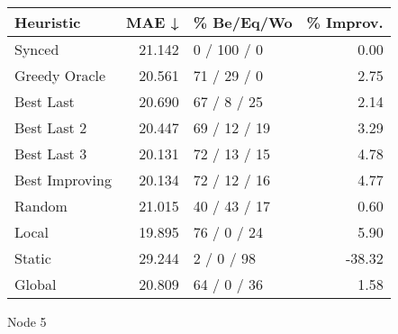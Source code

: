 \begin{tabular}{lrlr}
\toprule
\textbf{Heuristic} & \textbf{MAE ↓} & \textbf{\% Be/Eq/Wo} & \textbf{\% Improv.} \\
\midrule
            Synced &         21.142 &          0 / 100 / 0 &                0.00 \\
     Greedy Oracle &         20.561 &          71 / 29 / 0 &                2.75 \\
         Best Last &         20.690 &          67 / 8 / 25 &                2.14 \\
       Best Last 2 &         20.447 &         69 / 12 / 19 &                3.29 \\
       Best Last 3 &         20.131 &         72 / 13 / 15 &                4.78 \\
    Best Improving &         20.134 &         72 / 12 / 16 &                4.77 \\
            Random &         21.015 &         40 / 43 / 17 &                0.60 \\
             Local &         19.895 &          76 / 0 / 24 &                5.90 \\
            Static &         29.244 &           2 / 0 / 98 &              -38.32 \\
            Global &         20.809 &          64 / 0 / 36 &                1.58 \\
\bottomrule
\end{tabular}
\caption{Node 5}
\label{tab:non_lr01_le1_bs4_5}
